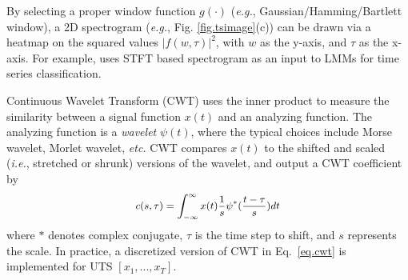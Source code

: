 By selecting a proper window function $g(\cdot)$ ({\em e.g.}, Gaussian/Hamming/Bartlett window), %
a 2D spectrogram ({\em e.g.}, Fig. \ref{fig.tsimage}(c)) can be drawn via a heatmap on the squared values $|f(w,\tau)|^{2}$, with $w$ as the y-axis, and $\tau$ as the x-axis. For example, \cite{dixit2024vision} uses STFT based spectrogram as an input to LMMs %
for time series classification.


\vspace{0.2cm}

Continuous Wavelet Transform (CWT) uses the inner product to measure the similarity between a signal function $x(t)$ and an analyzing function. %
The analyzing function is a {\em wavelet} $\psi(t)$, where the typical choices include Morse wavelet, Morlet wavelet, %
{\em etc.} %
CWT compares $x(t)$ to the shifted and scaled ({\em i.e.}, stretched or shrunk) versions of the wavelet, and output a CWT coefficient by
\begin{equation}\label{eq.cwt}
\small
\begin{aligned}
c(s,\tau) = \int_{-\infty}^{\infty}x(t)\frac{1}{s}\psi^{*}(\frac{t - \tau}{s})dt
\end{aligned}
\end{equation}
where $*$ denotes complex conjugate, $\tau$ is the time step to shift, and $s$ represents the scale. In practice, a discretized version of CWT in Eq.~\eqref{eq.cwt} is implemented for UTS $[x_{1}, ..., x_{T}]$.

